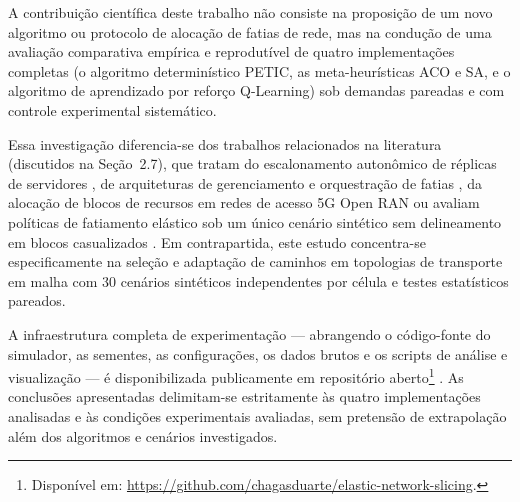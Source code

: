 A contribuição científica deste trabalho não consiste na proposição de um novo algoritmo ou protocolo de alocação de fatias de rede, mas na condução de uma avaliação comparativa empírica e reprodutível de quatro implementações completas (o algoritmo determinístico PETIC, as meta-heurísticas ACO e SA, e o algoritmo de aprendizado por reforço Q-Learning) sob demandas pareadas e com controle experimental sistemático.

Essa investigação diferencia-se dos trabalhos relacionados na literatura (discutidos na Seção~2.7), que tratam do escalonamento autonômico de réplicas de servidores \cite{pasin2013infaestrutura}, de arquiteturas de gerenciamento e orquestração de fatias \cite{maciel2020gerenciamento}, da alocação de blocos de recursos em redes de acesso 5G Open RAN \cite{limafilho2026controle} ou avaliam políticas de fatiamento elástico sob um único cenário sintético sem delineamento em blocos casualizados \cite{gomes2020strategies}. Em contrapartida, este estudo concentra-se especificamente na seleção e adaptação de caminhos em topologias de transporte em malha com 30 cenários sintéticos independentes por célula e testes estatísticos pareados.

A infraestrutura completa de experimentação — abrangendo o código-fonte do simulador, as sementes, as configurações, os dados brutos e os scripts de análise e visualização — é disponibilizada publicamente em repositório aberto\footnote{Disponível em: \url{https://github.com/chagasduarte/elastic-network-slicing}.}%
. As conclusões apresentadas delimitam-se estritamente às quatro implementações analisadas e às condições experimentais avaliadas, sem pretensão de extrapolação além dos algoritmos e cenários investigados.
